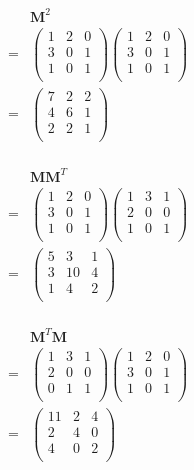 \documentclass[10pt,oneside,a4paper]{article}
\begin{document}
\begin{enumerate}
\[
\begin{split}
 & \mathbf{M}^2 \\
=& \begin{pmatrix} 1 & 2 & 0 \\ 3 & 0 & 1 \\ 1 & 0 & 1 \\ \end{pmatrix} \begin{pmatrix} 1 & 2 & 0 \\ 3 & 0 & 1 \\ 1 & 0 & 1 \\ \end{pmatrix} \\
=& \begin{pmatrix} 7 & 2 & 2 \\ 4 & 6 & 1 \\ 2 & 2 & 1 \\ \end{pmatrix} \\
\end{split}
\]

\[
\begin{split}
 & \mathbf{M}\mathbf{M}^T \\
=& \begin{pmatrix} 1 & 2 & 0 \\ 3 & 0 & 1 \\ 1 & 0 & 1 \\ \end{pmatrix} \begin{pmatrix} 1 & 3 & 1 \\ 2 & 0 & 0 \\ 1 & 0 & 1 \\ \end{pmatrix} \\
=& \begin{pmatrix} 5 & 3 & 1 \\ 3 & 10 & 4 \\ 1 & 4 & 2 \\ \end{pmatrix} \\
\end{split}
\]

\[
\begin{split}
 & \mathbf{M}^T\mathbf{M} \\
=& \begin{pmatrix} 1 & 3 & 1 \\ 2 & 0 & 0 \\ 0 & 1 & 1 \\ \end{pmatrix} \begin{pmatrix} 1 & 2 & 0 \\ 3 & 0 & 1 \\ 1 & 0 & 1 \\ \end{pmatrix} \\
=& \begin{pmatrix} 11 & 2 & 4 \\ 2 & 4 & 0 \\ 4 & 0 & 2 \\ \end{pmatrix} \\
\end{split}
\]


\end{enumerate}
\end{document}
